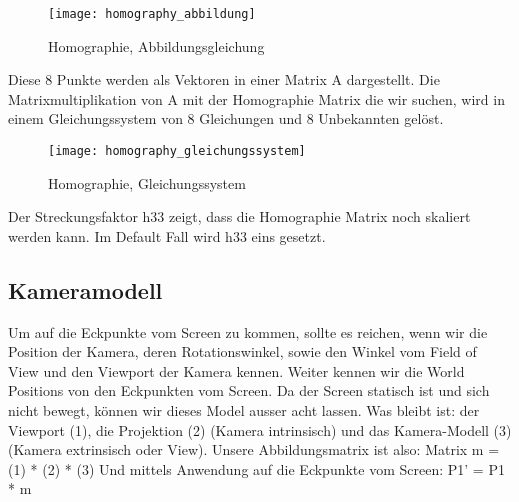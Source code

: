 			
\begin{figure}[hbt!]
\texttt{[image: homography\_abbildung]}
\caption{Homographie, Abbildungsgleichung}
\end{figure}
		
Diese 8 Punkte werden als Vektoren in einer Matrix A dargestellt. Die Matrixmultiplikation von A mit der Homographie Matrix die wir suchen, wird in einem Gleichungssystem von 8 Gleichungen und 8 Unbekannten gelöst.
			
			
\begin{figure}[hbt!]
\texttt{[image: homography\_gleichungssystem]}
\caption{Homographie, Gleichungssystem}
\end{figure}
		
Der Streckungsfaktor h33 zeigt, dass die Homographie Matrix noch skaliert werden kann. Im Default Fall wird h33 eins gesetzt.
\cite{OntarioTech}
\cite{HomographyEstimation}
			
\subsection{Kameramodell}

\vspace{0.5in}

Um auf die Eckpunkte vom Screen zu kommen, sollte es reichen, wenn wir die Position der Kamera, deren Rotationswinkel, sowie den Winkel vom Field of View und den Viewport der Kamera kennen. Weiter kennen wir die World Positions von den Eckpunkten vom Screen. Da der Screen statisch ist und sich nicht bewegt, können wir dieses Model ausser acht lassen. Was bleibt ist: der Viewport (1), die Projektion (2) (Kamera intrinsisch) und das Kamera-Modell (3) (Kamera extrinsisch oder View).
Unsere Abbildungsmatrix ist also:
Matrix m = (1) * (2) * (3)
Und mittels Anwendung auf die Eckpunkte vom Screen:
P1' = P1 * m
